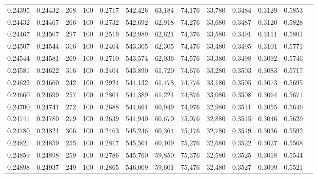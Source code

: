 \begin{tabular}{rrrrrrrrrrrrr}
0.24395 & 0.24432 &   268 & 100 &                                     0.2717 & 542,426 &  63,184 &  74,176 &  33,780 & 0.3484 & 0.3129 & 0.5853 \\
0.24432 & 0.24467 &   266 & 100 &                                     0.2732 & 542,692 &  62,918 &  74,276 &  33,680 & 0.3487 & 0.3120 & 0.5828 \\
0.24467 & 0.24507 &   297 & 100 &                                     0.2519 & 542,989 &  62,621 &  74,376 &  33,580 & 0.3491 & 0.3111 & 0.5801 \\
0.24507 & 0.24544 &   316 & 100 &                                     0.2404 & 543,305 &  62,305 &  74,476 &  33,480 & 0.3495 & 0.3101 & 0.5771 \\
0.24544 & 0.24581 &   269 & 100 &                                     0.2710 & 543,574 &  62,036 &  74,576 &  33,380 & 0.3498 & 0.3092 & 0.5746 \\
0.24581 & 0.24622 &   316 & 100 &                                     0.2404 & 543,890 &  61,720 &  74,676 &  33,280 & 0.3503 & 0.3083 & 0.5717 \\
0.24622 & 0.24660 &   242 & 100 &                                     0.2924 & 544,132 &  61,478 &  74,776 &  33,180 & 0.3505 & 0.3073 & 0.5695 \\
0.24660 & 0.24699 &   257 & 100 &                                     0.2801 & 544,389 &  61,221 &  74,876 &  33,080 & 0.3508 & 0.3064 & 0.5671 \\
0.24700 & 0.24741 &   272 & 100 &                                     0.2688 & 544,661 &  60,949 &  74,976 &  32,980 & 0.3511 & 0.3055 & 0.5646 \\
0.24741 & 0.24780 &   279 & 100 &                                     0.2639 & 544,940 &  60,670 &  75,076 &  32,880 & 0.3515 & 0.3046 & 0.5620 \\
0.24780 & 0.24821 &   306 & 100 &                                     0.2463 & 545,246 &  60,364 &  75,176 &  32,780 & 0.3519 & 0.3036 & 0.5592 \\
0.24821 & 0.24859 &   255 & 100 &                                     0.2817 & 545,501 &  60,109 &  75,276 &  32,680 & 0.3522 & 0.3027 & 0.5568 \\
0.24859 & 0.24898 &   259 & 100 &                                     0.2786 & 545,760 &  59,850 &  75,376 &  32,580 & 0.3525 & 0.3018 & 0.5544 \\
0.24898 & 0.24937 &   249 & 100 &                                     0.2865 & 546,009 &  59,601 &  75,476 &  32,480 & 0.3527 & 0.3009 & 0.5521 \\

\end{tabular}
